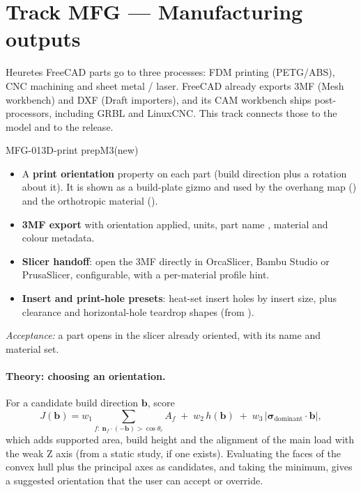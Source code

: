\section{Track MFG --- Manufacturing outputs}\label{sec:mfg}

Heuretes FreeCAD parts go to three processes: FDM printing (PETG/ABS), CNC machining and sheet metal / laser.
FreeCAD already exports 3MF (Mesh workbench) and DXF (Draft importers), and its CAM workbench ships
post-processors, including GRBL and LinuxCNC. This track connects those to the model and to the release.

\begin{epic}{MFG-01}{3D-print prep}{M3}{\stTodo}{(new)}
\begin{itemize}
  \item A \textbf{print orientation} property on each part (build direction plus a rotation about it). It is
        shown as a build-plate gizmo and used by the overhang map () and the orthotropic
        material ().
  \item \textbf{3MF export} with orientation applied, units, part name , material and colour
        metadata.
  \item \textbf{Slicer handoff}: open the 3MF directly in OrcaSlicer, Bambu Studio or PrusaSlicer, configurable,
        with a per-material profile hint.
  \item \textbf{Insert and print-hole presets}: heat-set insert holes by insert size, plus clearance and
        horizontal-hole teardrop shapes (from ).
\end{itemize}
\emph{Acceptance:} a part opens in the slicer already oriented, with its name and material set.
\end{epic}

\paragraph{Theory: choosing an orientation.} For a candidate build direction $\mathbf b$, score
\[
  J(\mathbf b)=w_1\!\!\sum_{f:\ \mathbf n_f\cdot(-\mathbf b)>\cos\theta_c}\!\! A_f
  \;+\;w_2\,h(\mathbf b)\;+\;w_3\,\big|\boldsymbol\sigma_{\text{dominant}}\cdot\mathbf b\big| ,
\]
which adds supported area, build height and the alignment of the main load with the weak Z axis (from a
static study, if one exists). Evaluating the faces of the convex hull plus the principal axes as candidates,
and taking the minimum, gives a suggested orientation that the user can accept or override.

